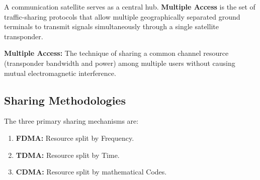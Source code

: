 \documentclass[12pt,a4paper]{article}
\begin{document}
A communication satellite serves as a central hub. \textbf{Multiple Access} is the set of traffic-sharing protocols that allow multiple geographically separated ground terminals to transmit signals simultaneously through a single satellite transponder.

\begin{tcolorbox}[defbox]
\textbf{Multiple Access:} The technique of sharing a common channel resource (transponder bandwidth and power) among multiple users without causing mutual electromagnetic interference.
\end{tcolorbox}

\subsection{Sharing Methodologies}
The three primary sharing mechanisms are:
\begin{enumerate}[label=\textbf{\arabic*.}, leftmargin=*, itemsep=2.5pt]
  \item \textbf{FDMA:} Resource split by Frequency.
  \item \textbf{TDMA:} Resource split by Time.
  \item \textbf{CDMA:} Resource split by mathematical Codes.
\end{enumerate}
\end{document}

